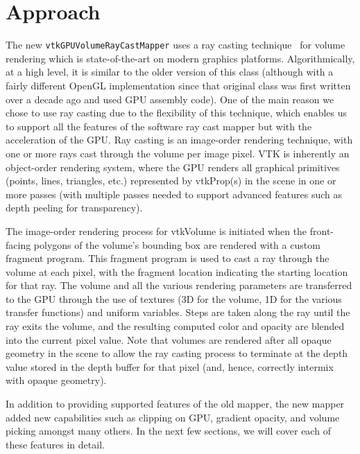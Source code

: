 \section{Approach}
\label{approach}
The new \texttt{vtkGPUVolumeRayCastMapper} uses a ray casting
technique~\citep{engel_real-time_2006} for volume rendering which is
state-of-the-art on modern graphics platforms. Algorithmically, at a
high level, it is similar to the older version of this
class (although with a fairly different OpenGL implementation since that
original class was first written over a decade ago and used GPU assembly code).
One of the main reason we chose to use ray casting due to the flexibility of
this technique, which enables us to support all the features of the software ray
cast mapper but with the acceleration of the GPU. Ray casting is an image-order
rendering technique, with one or more rays cast through the volume per image
pixel. VTK is inherently an object-order rendering system, where the GPU renders
all graphical primitives (points, lines, triangles, etc.) represented by
vtkProp(s) in the scene in one or more passes (with multiple passes needed to
support advanced features such as depth peeling for transparency).

The image-order rendering process for vtkVolume is initiated when the
front-facing polygons of the volume’s bounding box are rendered with a custom
fragment program. This fragment program is used to cast a ray through the volume
at each pixel, with the fragment location indicating the starting location for
that ray. The volume and all the various rendering parameters are transferred to
the GPU through the use of textures (3D for the volume, 1D for the various
transfer functions) and uniform variables. Steps are taken along the ray until
the ray exits the volume, and the resulting computed color and opacity are
blended into the current pixel value. Note that volumes are rendered after all
opaque geometry in the scene to allow the ray casting process to terminate at
the depth value stored in the depth buffer for that pixel (and, hence, correctly
intermix with opaque geometry).

In addition to providing supported features of the old mapper, the new mapper
added new capabilities such as clipping on GPU,  gradient opacity, and volume
picking amongst many others. In the next few sections, we will cover each of
these features in detail.

